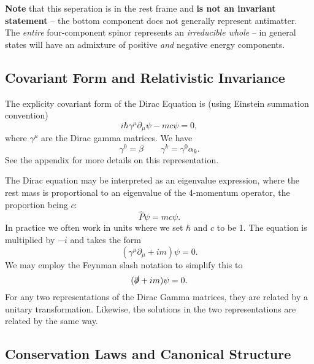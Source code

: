 \textbf{Note} that this seperation is in the rest frame and \textbf{is not an invariant statement} -- the bottom component does not generally represent antimatter. The \emph{entire} four-component spinor represents an \emph{irreducible whole} -- in general states will have an admixture of positive \emph{and} negative energy components.

\subsection{Covariant Form and Relativistic Invariance}

The explicity covariant form of the Dirac Equation is (using Einstein summation convention)
\begin{equation}
i\hbar\gamma^\mu\partial_\mu\psi - mc\psi = 0,
\end{equation}
where $\gamma^\mu$ are the Dirac gamma matrices. We have
\begin{equation}
\gamma^0 = \beta \qquad \gamma^k = \gamma^0\alpha_k.
\end{equation}
See the appendix for more details on this representation.

The Dirac equation may be interpreted as an eigenvalue expression, where the rest mass is proportional to an eigenvalue of the 4-momentum operator, the proportion being $c$:
\begin{equation}
\hat{P}\psi = mc\psi.
\end{equation}
In practice we often work in units where we set $\hbar$ and $c$ to be 1. The equation is multiplied by $-i$ and takes the form
\begin{equation}
\left(\gamma^\mu\partial_\mu + im \right)\psi = 0.
\end{equation}
We may employ the Feynman slash notation to simplify this to
\begin{equation}
(\slashed{\partial} + im)\psi = 0. 
\end{equation}
For any two representations of the Dirac Gamma matrices, they are related by a unitary transformation. Likewise, the solutions in the two representations are related by the same way.


\subsection{Conservation Laws and Canonical Structure}

